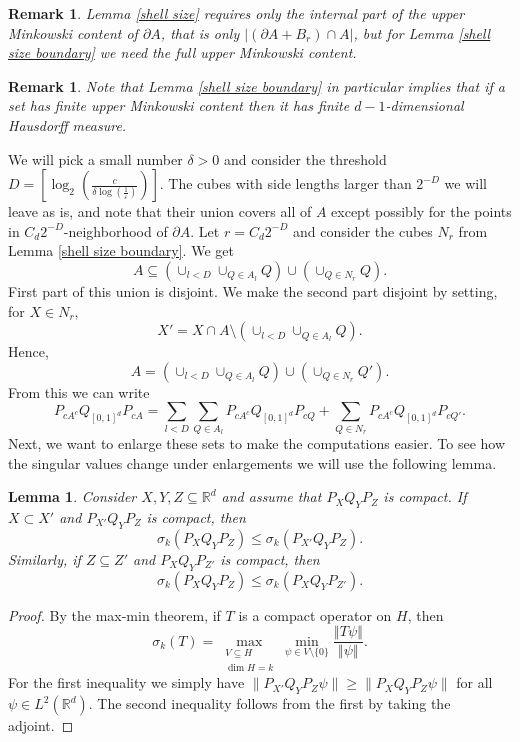 \documentclass[12pt]{amsart}
\numberwithin{equation}{section}
\newcommand{\R}{\mathbb{R}}
\newcommand{\eps}{\varepsilon}
\newcommand{\norm}[1]{\left\Vert #1 \right\Vert}
\newtheorem{lemma}[Thm]{Lemma}
\newtheorem{remark}[Thm]{Remark}
\begin{document}
\begin{remark}
Lemma \ref{shell size} requires only the internal part of the upper Minkowski content of $\partial A$, that is only $|(\partial A+B_r)\cap A|$, but for Lemma \ref{shell size boundary} we need the full upper Minkowski content.
\end{remark}

\begin{remark}
Note that Lemma \ref{shell size boundary} in particular implies that if a set has finite upper Minkowski content then it has finite $d-1$-dimensional Hausdorff measure.
\end{remark}



We will pick a small number $\delta > 0$ and consider the threshold $D = \left[\log_2\left(\frac{c}{\delta \log(\frac{1}{\eps})}\right)\right]$. The cubes with side lengths larger than $2^{-D}$ we will leave as is, and note that their union covers all of $A$ except possibly for the points in $C_d2^{-D}$-neighborhood of $\partial A$. Let $r = C_d2^{-D}$ and consider the cubes $N_r$ from Lemma \ref{shell size boundary}. We get
$$A\subseteq \left(\cup_{l < D}\cup_{Q\in A_l} Q\right) \cup \left(\cup_{Q\in N_r} Q\right).$$
First part of this union is disjoint. We make the second part disjoint by setting, for $X \in N_r,$
\[
X' = X \cap A \setminus (\cup_{l < D}\cup_{Q\in A_l} Q).
\]
Hence, $$A = \left(\cup_{l < D}\cup_{Q\in A_l} Q\right) \cup \left(\cup_{Q\in N_r} Q'\right).$$
From this we can write
\begin{equation}\label{operator decomposition sum}
P_{cA^c}Q_{[0,1]^d}P_{cA} = \sum_{l < D}\sum_{Q\in A_l} P_{cA^c}Q_{[0,1]^d}P_{cQ} + \sum_{Q\in N_r} P_{cA^c}Q_{[0,1]^d}P_{cQ'}.
\end{equation}
Next, we want to enlarge these sets to make the computations easier. To see how the singular values change under enlargements we will use the following lemma.

\begin{lemma}\label{enlargement}
Consider $X, Y, Z \subseteq \R^d$ and assume that $P_X Q_Y P_Z$ is compact. If $X\subset X'$ and $P_{X'}Q_Y P_Z$ is compact, then
\[
\sigma_k(P_X Q_Y P_Z) \leq \sigma_k(P_{X'} Q_Y P_Z).
\]
Similarly, if $Z\subseteq Z'$ and $P_X Q_Y P_{Z'}$ is compact, then 
\[
\sigma_k(P_X Q_Y P_Z) \leq \sigma_k(P_{X} Q_Y P_{Z'}).
\]
\end{lemma}
\begin{proof}
By the max-min theorem, if $T$ is a compact operator on $H$, then
\[
\sigma_k(T) = \max_{\substack{V\subseteq H\\ \dim{H} = k}} \min_{\psi \in V\setminus \{0\}} \frac{\norm{T\psi}}{\norm{\psi}}.
\]
For the first inequality we simply have $\|P_{X'}Q_YP_Z\psi\| \ge \|P_XQ_YP_Z\psi\|$ for all $\psi \in L^2(\R^d)$. The second inequality follows from the first by taking the adjoint. 
\end{proof}
\end{document}
